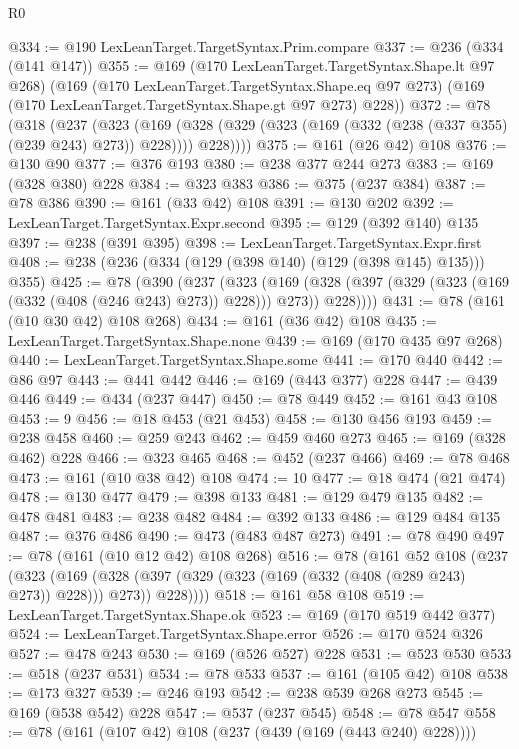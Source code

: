 \begin{lexlean}{R0}
\begin{coremodule}
{{{{{{{{{{{{{{{{{{{{{{{{{{{{{{{{{{{{{{{{{{{{{{{{{{{{{{{{{{{{{{{{{{{{{{{{{{{{{{{{{{{{{{{{{{{{{{{{{{{{{{{{{@334 := @190 LexLeanTarget.TargetSyntax.Prim.compare
@337 := @236 (@334 (@141 @147))
@355 := @169
    (@170 LexLeanTarget.TargetSyntax.Shape.lt @97 @268)
    (@169
      (@170 LexLeanTarget.TargetSyntax.Shape.eq @97 @273)
      (@169 (@170 LexLeanTarget.TargetSyntax.Shape.gt @97 @273) @228))
@372 := @78
    (@318
      (@237
        (@323
          (@169 (@328 (@329 (@323 (@169 (@332 (@238 (@337 @355) (@239 @243) @273)) @228)))) @228))))
@375 := @161 (@26 @42) @108
@376 := @130 @90
@377 := @376 @193
@380 := @238 @377 @244 @273
@383 := @169 (@328 @380) @228
@384 := @323 @383
@386 := @375 (@237 @384)
@387 := @78 @386
@390 := @161 (@33 @42) @108
@391 := @130 @202
@392 := LexLeanTarget.TargetSyntax.Expr.second
@395 := @129 (@392 @140) @135
@397 := @238 (@391 @395)
@398 := LexLeanTarget.TargetSyntax.Expr.first
@408 := @238 (@236 (@334 (@129 (@398 @140) (@129 (@398 @145) @135))) @355)
@425 := @78
    (@390
      (@237
        (@323
          (@169 (@328 (@397 (@329 (@323 (@169 (@332 (@408 (@246 @243) @273)) @228))) @273)) @228))))
@431 := @78 (@161 (@10 @30 @42) @108 @268)
@434 := @161 (@36 @42) @108
@435 := LexLeanTarget.TargetSyntax.Shape.none
@439 := @169 (@170 @435 @97 @268)
@440 := LexLeanTarget.TargetSyntax.Shape.some
@441 := @170 @440
@442 := @86 @97
@443 := @441 @442
@446 := @169 (@443 @377) @228
@447 := @439 @446
@449 := @434 (@237 @447)
@450 := @78 @449
@452 := @161 @43 @108
@453 := 9
@456 := @18 @453 (@21 @453)
@458 := @130 @456 @193
@459 := @238 @458
@460 := @259 @243
@462 := @459 @460 @273
@465 := @169 (@328 @462) @228
@466 := @323 @465
@468 := @452 (@237 @466)
@469 := @78 @468
@473 := @161 (@10 @38 @42) @108
@474 := 10
@477 := @18 @474 (@21 @474)
@478 := @130 @477
@479 := @398 @133
@481 := @129 @479 @135
@482 := @478 @481
@483 := @238 @482
@484 := @392 @133
@486 := @129 @484 @135
@487 := @376 @486
@490 := @473 (@483 @487 @273)
@491 := @78 @490
@497 := @78 (@161 (@10 @12 @42) @108 @268)
@516 := @78
    (@161
      @52
      @108
      (@237
        (@323
          (@169 (@328 (@397 (@329 (@323 (@169 (@332 (@408 (@289 @243) @273)) @228))) @273)) @228))))
@518 := @161 @58 @108
@519 := LexLeanTarget.TargetSyntax.Shape.ok
@523 := @169 (@170 @519 @442 @377)
@524 := LexLeanTarget.TargetSyntax.Shape.error
@526 := @170 @524 @326
@527 := @478 @243
@530 := @169 (@526 @527) @228
@531 := @523 @530
@533 := @518 (@237 @531)
@534 := @78 @533
@537 := @161 (@105 @42) @108
@538 := @173 @327
@539 := @246 @193
@542 := @238 @539 @268 @273
@545 := @169 (@538 @542) @228
@547 := @537 (@237 @545)
@548 := @78 @547
@558 := @78 (@161 (@107 @42) @108 (@237 (@439 (@169 (@443 @240) @228))))
}}}}}}}}}}}}}}}}}}}}}}}}}}}}}}}}}}}}}}}}}}}}}}}}}}}}}}}}}}}}}}}}}}}}}}}}}}}}}}}}}}}}}}}}}}}}}}}}}}}}}}}}}
\end{coremodule}
\end{lexlean}
